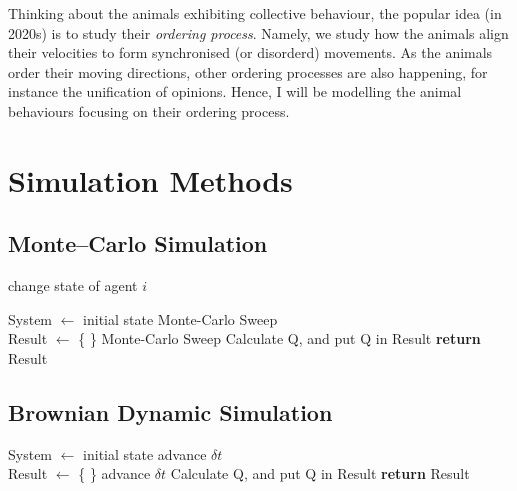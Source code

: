 \documentclass[11pt,twoside]{report}
\begin{document}
Thinking about the animals exhibiting collective behaviour, the popular idea (in 2020s) is to study their \emph{ordering process}. Namely, we study how the animals align their velocities to form synchronised (or disorderd) movements. As the animals order their moving directions, other ordering processes are also happening, for instance the unification of opinions. Hence, I will be modelling the animal behaviours focusing on their ordering process.


\section{Simulation Methods}

\subsection{Monte--Carlo Simulation}

\begin{tcolorbox}[
title=Monte--Carlo Sweep,
enlarge bottom by=0.5em,
enlarge top by=0.5em,
]
\label{alg:graph-vnm}
\begin{algorithmic}
\State change state of agent $i$
\EndFor
\EndProcedure
\end{algorithmic}
\end{tcolorbox}


\begin{tcolorbox}[
title=General Description of MC simulation,
enlarge bottom by=0.5em,
enlarge top by=0.5em,
]
\label{alg:graph-vnm}
\begin{algorithmic}
\State System $\gets$ initial state
\Repeat
	\State Monte-Carlo Sweep
 \\

\State Result $\gets$ \{ \}
\Repeat
	\State Monte-Carlo Sweep
	\State Calculate Q, and put Q in Result
\State \textbf{return} Result
\EndProcedure
\end{algorithmic}
\end{tcolorbox}


\subsection{Brownian Dynamic Simulation}


\begin{tcolorbox}[
title=General Description of BD simulation,
enlarge bottom by=0.5em,
enlarge top by=0.5em,
]
\label{alg:graph-vnm}
\begin{algorithmic}
\State System $\gets$ initial state
\Repeat
	\State advance $\delta t$
 \\

\State Result $\gets$ \{ \}
\Repeat
	\State advance $\delta t$
	\State Calculate Q, and put Q in Result
\State \textbf{return} Result
\EndProcedure
\end{algorithmic}
\end{tcolorbox}
\end{document}
